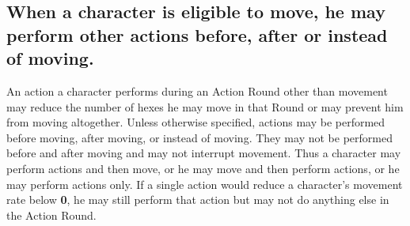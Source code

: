 \subsection[Other Actions]{When a character is eligible to move, he
  may perform other actions before, after or instead of moving.} 
\label{sec:other-actions}

An action a character performs during an Action Round other than
movement may reduce the number of hexes he may move in that Round or
may prevent him from moving altogether. Unless otherwise specified,
actions may be performed before moving, after moving, or instead of
moving. They may not be performed before and after moving and may not
interrupt movement. Thus a character may perform actions and then
move, or he may move and then perform actions, or he may perform
actions only. If a single action would reduce a character's movement
rate below \textbf{0}, he may still perform that action but may not do
anything else in the Action Round.

